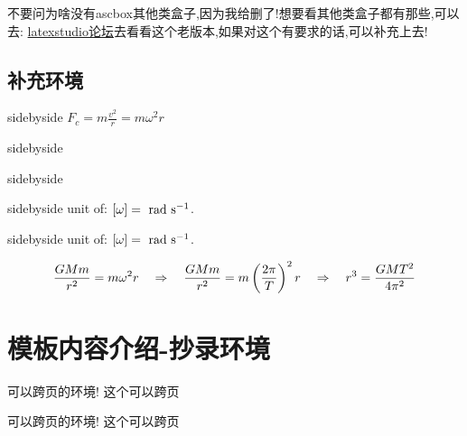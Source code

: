 不要问为啥没有ascbox其他类盒子,因为我给删了!想要看其他类盒子都有那些,可以去:
\href{https://www.latexstudio.net/index/details/index/mid/2314.html}{latexstudio论坛}去看看这个老版本,如果对这个有要求的话,可以补充上去!

\subsection{补充环境}

\begin{tcblisting}{sidebyside}
$\boxed{ F_c = m\frac{v^2}{r} = m\omega^2r}$
\end{tcblisting}


\begin{tcblisting}{sidebyside}
\end{tcblisting}

\begin{tcblisting}{sidebyside}
\end{tcblisting}

\begin{tcblisting}{sidebyside}
     \cmt unit of: $[\omega] = \radps$.
\end{tcblisting}


\begin{tcblisting}{sidebyside}
    \sol  unit of: $[\omega] = \radps$.
\end{tcblisting}
\begin{tcblisting}{}
   \solc
   \begin{equation*}
       \frac{GMm}{r^2} = m \omega^2 r \RA \frac{GMm}{r^2} = m\left(\frac{2\pi}{T}\right)^2 r \RA r^3 = \frac{GMT^2}{4\pi^2}
   \end{equation*}
\end{tcblisting}

\begin{tcblisting}{}
\end{tcblisting}

\section{模板内容介绍-抄录环境}
可以跨页的环境!
这个可以跨页
\btrule{}
\begin{tcblisting}{}
可以跨页的环境!
这个可以跨页
\btrule{}
\end{tcblisting}


